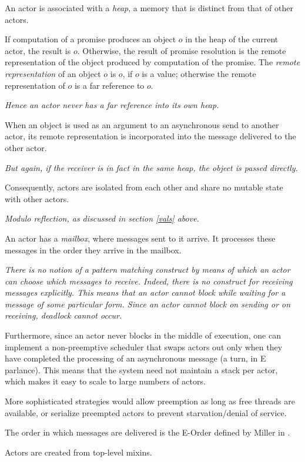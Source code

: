 \documentclass{article}
\begin{document}
An actor is associated with a {\em heap}, a memory that is distinct from that of other actors. 

If computation of a promise produces  an object $o$ in the heap of the current actor, the result is $o$. Otherwise, the result of promise resolution is the remote representation of the object produced by computation of the promise. The {\em remote representation} of an object $o$ is $o$, if $o$ is a value; otherwise the remote representation of $o$ is a far reference to $o$.


{\it Hence an actor never has a far reference into its own heap.
}

When an object is used as an argument to an asynchronous send to another actor, its remote representation is incorporated into the message delivered to the other actor. 

{\it But again, if the receiver is in fact in the same heap, the object is passed directly.}

Consequently, actors are isolated from each other and share no mutable state with other actors.

{\it Modulo reflection, as discussed in section \ref{vals} above.}

An actor has a {\em mailbox}, where messages sent to it arrive. It processes these messages in the order they arrive in the mailbox. 

{\it 
There is no notion of a pattern matching construct  by means of which an actor can choose which messages to receive. Indeed, there is no construct for receiving messages explicitly. This means that an actor cannot block while waiting for a message of some particular form. Since an actor cannot block on sending or on receiving, deadlock cannot occur.

Furthermore, since an actor never blocks in the middle of execution, one can implement a non-preemptive scheduler that swaps actors out only when they have completed the processing of an asynchronous message (a turn, in E parlance). This means that the system need not maintain a stack per actor, which makes it easy to scale to large numbers of actors.

More sophisticated strategies would allow preemption as long as free threads are available, or
serialize preempted actors to prevent starvation/denial of service.
}

The order in which messages are delivered is the E-Order defined by Miller in \cite{RobustComposition}.

Actors are created from top-level mixins. 
\end{document}
